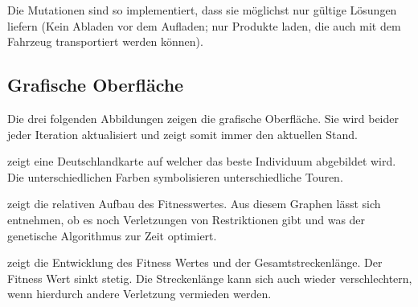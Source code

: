 Die Mutationen sind so implementiert, dass sie möglichst nur gültige Lösungen liefern (Kein Abladen vor dem Aufladen; nur Produkte laden, die auch mit dem Fahrzeug transportiert werden können). 

\newpage
\subsection{Grafische Oberfläche}
\label{sec:GrafischeOberflaeche}
Die drei folgenden Abbildungen zeigen die grafische Oberfläche. Sie wird beider jeder Iteration aktualisiert und zeigt somit immer den aktuellen Stand.

 zeigt eine Deutschlandkarte auf welcher das beste Individuum abgebildet wird. Die unterschiedlichen Farben symbolisieren unterschiedliche Touren.

 zeigt die relativen Aufbau des Fitnesswertes. Aus diesem Graphen lässt sich entnehmen, ob es noch Verletzungen von Restriktionen gibt und was der genetische Algorithmus zur Zeit optimiert.

 zeigt die Entwicklung des Fitness Wertes und der Gesamtstreckenlänge. Der Fitness Wert sinkt stetig. Die Streckenlänge kann sich auch wieder verschlechtern, wenn hierdurch andere Verletzung vermieden werden.



